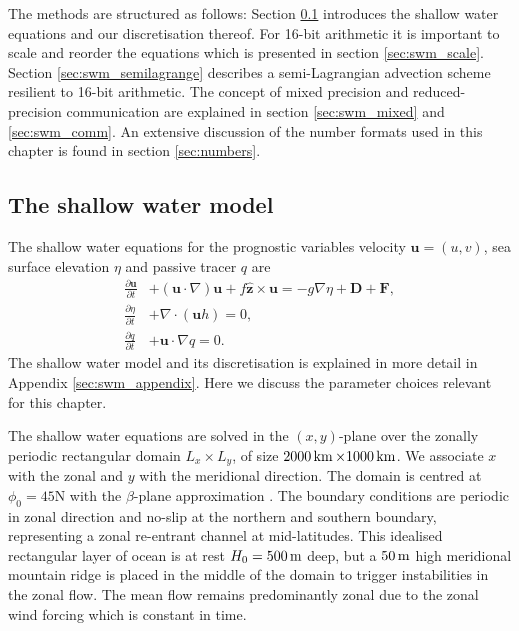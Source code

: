 The methods are structured as follows: Section \ref{sec:swm_swm} introduces the shallow water equations and our
discretisation thereof. For 16-bit arithmetic it is important to scale and reorder the equations which is presented in 
section \ref{sec:swm_scale}. Section \ref{sec:swm_semilagrange} describes a semi-Lagrangian advection scheme
resilient to 16-bit arithmetic. The concept of mixed precision and reduced-precision communication are explained
in section \ref{sec:swm_mixed} and \ref{sec:swm_comm}. An extensive discussion of the number formats used in
this chapter is found in section \ref{sec:numbers}.

\subsection{The shallow water model}
\label{sec:swm_swm}

The shallow water equations for the prognostic variables velocity $\mathbf{u} = (u,v)$, sea surface elevation $\eta$ and
passive tracer $q$ are \citep{Gill1982,Vallis2006}
\begin{subequations}
\begin{align}
\frac{\partial \mathbf{u}}{\partial t} &+ (\mathbf{u} \cdot \nabla) \mathbf{u} +
f\hat{\mathbf{z}} \times \mathbf{u} = -g\nabla \eta + \mathbf{D} + \mathbf{F}, \\
\frac{\partial \eta}{\partial t} &+ \nabla \cdot (\mathbf{u}h) = 0, \\
\frac{\partial q}{\partial t} &+ \mathbf{u} \cdot \nabla q = 0.
\end{align}
\label{eq:swe}%
\end{subequations}
The shallow water model and its discretisation is explained in more detail in Appendix \ref{sec:swm_appendix}. Here we
discuss the parameter choices relevant for this chapter.

The shallow water equations are solved in the $(x,y)$-plane over the zonally periodic rectangular domain $L_x \times L_y$,
of size $2000\operatorname{km} \times 1000\operatorname{km}$. We associate $x$ with the zonal and $y$ with the meridional direction. The domain
is centred at $\phi_0 = 45$\textdegree{}N with the $\beta$-plane approximation \citep{Vallis2006}. The boundary conditions are
periodic in zonal direction and no-slip at the northern and southern boundary, representing a zonal re-entrant channel at
mid-latitudes. This idealised rectangular layer of ocean is at rest $H_0 = 500\operatorname{m}$ deep, but a $50\operatorname{m}$ high meridional
mountain ridge is placed in the middle of the domain to trigger instabilities in the zonal flow. The mean flow remains predominantly
zonal due to the zonal wind forcing which is constant in time.

